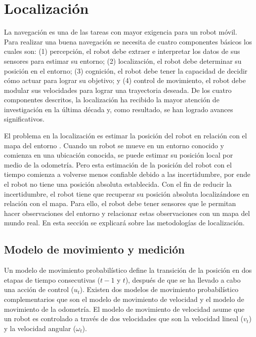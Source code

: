 \section{Localizaci\'on}
La navegaci\'on es una de las tareas con mayor exigencia para un robot 
m\'ovil. Para realizar una buena navegaci\'on se necesita de cuatro 
componentes b\'asicos los cuales son: (1) percepci\'on, el robot debe extraer 
e interpretar los datos de sus sensores para estimar su entorno; (2) localizaci\'on, 
el robot debe determinar su posici\'on en el entorno; 
(3) cognici\'on, el robot debe tener la capacidad de decidir c\'omo 
actuar para lograr su objetivo; y (4) control de movimiento, el 
robot debe modular sus velocidades para lograr una trayectoria deseada. De los cuatro 
componentes descritos, la localizaci\'on ha recibido la mayor atenci\'on 
de investigaci\'on en la \'ultima d\'ecada y, como resultado, se han logrado
avances significativos. %

El problema en la localizaci\'on es estimar la posici\'on del robot en 
relaci\'on con el mapa del entorno \cite{dellaert1999monte}. Cuando un robot se 
mueve en un entorno conocido y comienza en una ubicaci\'on conocida, se puede estimar su posici\'on 
local por medio de la odometr\'ia. Pero esta estimaci\'on de la posici\'on del robot
con el tiempo comienza a volverse menos confiable debido a las incertidumbre,
por ende el robot no tiene una posici\'on absoluta establecida. Con el fin de reducir 
la incertidumbre, el robot tiene que recuperar su posici\'on absoluta localiz\'andose 
en relaci\'on con el mapa. Para ello, el robot debe tener sensores que le permitan 
hacer observaciones del entorno y relacionar estas observaciones con un mapa 
del mundo real. En esta secci\'on se explicar\'a sobre las metodolog\'ias 
de localizaci\'on.

\subsection{Modelo de movimiento y medici\'on}

Un modelo de movimiento probabil\'istico define la transici\'on de la posici\'on 
en dos etapas de tiempo consecutivas ($t-1$ y $t$), despu\'es de que se ha llevado 
a cabo una acci\'on de control ($u_{t}$). Existen dos modelos de movimiento 
probabil\'istico complementarios que son el modelo de movimiento de velocidad y 
el modelo de movimiento de la odometr\'ia. El modelo de movimiento de velocidad 
asume que un robot es controlado a trav\'es de dos velocidades que son la 
velocidad lineal ($v_{t}$) y la velocidad angular ($\omega_{t}$).

